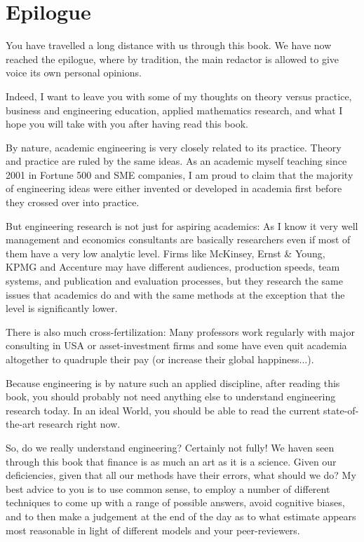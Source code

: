 \documentclass[12pt,a4paper,twoside,openright]{report}
\newcounter{def}
\theoremstyle{definition}
\theoremstyle{itexmp}
\numberwithin{equation}{section}
\begin{document}
 	\chapter{Epilogue}
	You have travelled a long distance with us through this book. We have now reached the epilogue, where by tradition, the main redactor is allowed to give voice its own personal opinions. 

	Indeed, I want to leave you with some of my thoughts on theory versus practice, business and engineering education, applied mathematics research, and what I hope you will take with you after having read this book.
	
	By nature, academic engineering is very closely related to its practice. Theory and practice are ruled by the same ideas. As an academic myself teaching since 2001 in Fortune 500 and SME companies, I am proud to claim that the majority of engineering ideas were either invented or developed in academia first before they crossed over into practice.
	
	But engineering research is not just for aspiring academics: As I know it very well management and economics consultants are basically researchers even if most of them have a very low analytic level. Firms like McKinsey, Ernst \& Young, KPMG and Accenture may have different audiences, production speeds, team systems, and publication and evaluation processes, but they research the same issues that academics do and with the same methods at the exception that the level is significantly lower.

	There is also much cross-fertilization: Many professors work regularly with major consulting in USA or asset-investment firms and some have even quit academia altogether to quadruple their pay (or increase their global happiness...).

	Because engineering is by nature such an applied discipline, after reading this book, you should probably not need anything else to understand engineering research today. In an ideal World, you should be able to read the current state-of-the-art research right now.
	
	So, do we really understand engineering? Certainly not fully! We haven seen through this book that finance is as much an art as it is a science. Given our deficiencies, given that all our methods have their errors, what should we do? My best advice to you is to use common sense, to employ a number of different techniques to come up with a range of possible answers, avoid cognitive biases, and to then make a judgement at the end of the day as to what estimate appears most reasonable in light of different models and your peer-reviewers.
	
\end{document}

